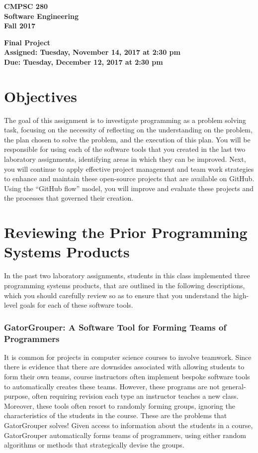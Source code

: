 \documentclass[11pt]{article}
\newcommand{\assignmentduedate}{December 12}
\newcommand{\assignmentassignedate}{November 14}
\newcommand{\labyear}{2017}
\newcommand{\labday}{Tuesday}
\newcommand{\labtime}{2:30 pm}
\newcommand{\assigneddate}{Assigned: \labday, \assignmentassignedate, \labyear{} at \labtime{}}
\newcommand{\duedate}{Due: \labday, \assignmentduedate, \labyear{} at \labtime{}}
\newcommand{\labtitle}[1]
{
  \begin{center}
    \begin{center}
      \bf
      CMPSC 280\\Software Engineering\\
      Fall 2017\\
      \medskip
    \end{center}
    \bf
    #1
  \end{center}
}
\begin{document}
\thispagestyle{empty}

\labtitle{Final Project \\ \assigneddate{} \\ \duedate{}}

\section*{Objectives}

The goal of this assignment is to investigate programming as a problem solving task, focusing on the necessity of
reflecting on the understanding on the problem, the plan chosen to solve the problem, and the execution of this plan.
You will be responsible for using each of the software tools that you created in the last two laboratory assignments,
identifying areas in which they can be improved. Next, you will continue to apply effective project management and team
work strategies to enhance and maintain these open-source projects that are available on GitHub. Using the ``GitHub
flow'' model, you will improve and evaluate these projects and the processes that governed their creation.

\section*{Reviewing the Prior Programming Systems Products}

In the past two laboratory assignments, students in this class implemented three programming systems products, that are
outlined in the following descriptions, which you should carefully review so as to ensure that you understand the
high-level goals for each of these software tools.

\subsubsection*{GatorGrouper: A Software Tool for Forming Teams of Programmers}

It is common for projects in computer science courses to involve teamwork. Since there is evidence that there are
downsides associated with allowing students to form their own teams, course instructors often implement bespoke software
tools to automatically creates these teams. However, these programs are not general-purpose, often requiring revision each
type an instructor teaches a new class. Moreover, these tools often resort to randomly forming groups, ignoring the
characteristics of the students in the course. These are the problems that GatorGrouper solves! Given access to
information about the students in a course, GatorGrouper automatically forms teams of programmers, using either random
algorithms or methods that strategically devise the groups.
\end{document}
